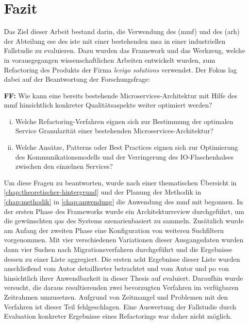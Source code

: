 \chapter{Fazit}
\label{chap:fazit}

Das Ziel dieser Arbeit bestand darin, die Verwendung des  (\acrshort{mmf}) und des  (\acrshort{arh}) der Abteilung \acrfull{ese} des \acrfull{iste} mit einer bestehenden \acrfull{msa} in einer industriellen Fallstudie zu evaluieren.
Dazu wurden das Framework und das Werkzeug, welche in vorausgegangen wissenschaftlichen Arbeiten entwickelt wurden, zum Refactoring des Produkts \jf der Firma \emph{levigo solutions} verwendet.
Der Fokus lag dabei auf der Beantwortung der Forschungsfrage:

\textbf{FF:} Wie kann eine bereits bestehende Microservices-Architektur mit Hilfe des \acrfull{mmf} hinsichtlich konkreter Qualitätsaspekte weiter optimiert werden?
\begin{enumerate}[i.]
	\item Welche Refactoring-Verfahren eignen sich zur Bestimmung der optimalen Service Granularität einer bestehenden Microservices-Architektur?
	\item Welche Ansätze, Patterns oder Best Practices eignen sich zur Optimierung des Kom\-mu\-ni\-ka\-tions\-mo\-dells und der Verringerung des IO-Flaschenhalses zwischen den einzelnen Services?
\end{enumerate}

Um diese Fragen zu beantworten, wurde nach einer thematischen Übersicht in \cref{chap:theoretischer-hintergrund} und der Planung der Methodik in \cref{chap:methodik} in \cref{chap:anwendung} die Anwendung des \gls{mmf} mit \jf begonnen.
In der ersten Phase des Frameworks wurde ein Architekturreview durchgeführt, um die gewünschten \glspl{qa} des Systems szenarienbasiert zu sammeln.
Zusätzlich wurde am Anfang der zweiten Phase eine Konfiguration von weiteren Suchfiltern vorgenommen.
Mit vier verschiedenen Variationen dieser Ausgangsdaten wurden dann vier Suchen nach Migrationsverfahren durchgeführt und die Ergebnisse dessen zu einer Liste aggregiert.
Die ersten acht Ergebnisse dieser Liste wurden anschließend vom Autor detaillierter betrachtet und vom Autor und \gls{po} von \jf hinsichtlich ihrer Anwendbarkeit in dieser Thesis auf \jf evaluiert.
Daraufhin wurde versucht, die daraus resultierenden zwei bevorzugten Verfahren im verfügbaren Zeitrahmen umzusetzen.
Aufgrund von Zeitmangel und Problemen mit den Verfahren ist dieser Teil fehlgeschlagen.
Eine Auswertung der Fallstudie durch Evaluation konkreter Ergebnisse eines Refactorings war daher nicht möglich.

